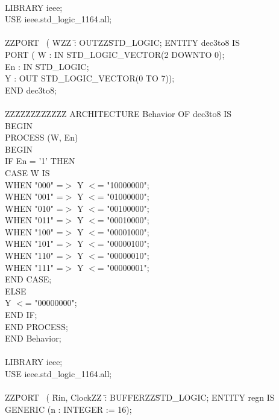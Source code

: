 \documentclass[epsfig,10pt,fullpage]{article}
\begin{document}
\begin{center}
\begin{minipage}[t]{12.5 cm}
\begin{tabbing}
~\\
LIBRARY ieee;\\
USE ieee.std\_logic\_1164.all;\\
~\\
ZZ\=PORT ~( \=WZZ \=: OUTZZ\=STD\_LOGIC;\kill
ENTITY dec3to8 IS\\
\>PORT ( \>W \>: IN \>STD\_LOGIC\_VECTOR(2 DOWNTO 0);\\
\>\>En \>: IN \>STD\_LOGIC;\\
\>\>Y \>: OUT \>STD\_LOGIC\_VECTOR(0 TO 7));\\
END dec3to8;\\
~\\
ZZ\=ZZ\=ZZ\=ZZ\=ZZ\=ZZ\=\kill
ARCHITECTURE Behavior OF dec3to8 IS\\
BEGIN\\
\>PROCESS (W, En)\\
\>BEGIN\\
\>\>IF En = '1' THEN\\
\>\>\>CASE W IS\\
\>\>\>\>WHEN "000" =$>$ Y $<$= "10000000";\\
\>\>\>\>WHEN "001" =$>$ Y $<$= "01000000";\\
\>\>\>\>WHEN "010" =$>$ Y $<$= "00100000";\\
\>\>\>\>WHEN "011" =$>$ Y $<$= "00010000";\\
\>\>\>\>WHEN "100" =$>$ Y $<$= "00001000";\\
\>\>\>\>WHEN "101" =$>$ Y $<$= "00000100";\\
\>\>\>\>WHEN "110" =$>$ Y $<$= "00000010";\\
\>\>\>\>WHEN "111" =$>$ Y $<$= "00000001";\\
\>\>\>END CASE;\\
\>\>ELSE \\
\>\>\>Y $<$= "00000000";\\
\>\>END IF;\\
\>END PROCESS;\\
END Behavior;\\
~\\
LIBRARY ieee;\\
USE ieee.std\_logic\_1164.all;\\
~\\
ZZ\=PORT ~( \=Rin, ClockZZ \=: BUFFERZZ\=STD\_LOGIC;\kill
ENTITY regn IS\\
\>GENERIC (n : INTEGER := 16);\\

\end{tabbing}
\end{minipage}
\end{center}
\end{document}
